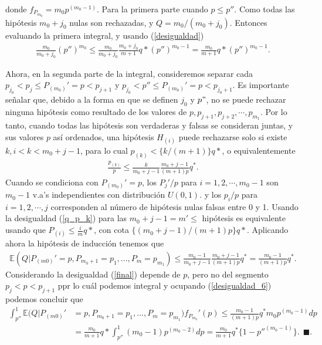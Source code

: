 \documentclass[11pt,letterpaper]{article}
\newcommand{\mE}{\mathbb{E}}
\newcommand{\finf}{\blacksquare.}
\begin{document}
donde $f_{P_{m_0}}=m_0p^{(m_0-1)}.$
Para la primera parte cuando $p\leq p''$. Como todas las hipótesis $m_0+j_0$ nulas son rechazadas, y $Q=m_0/(m_0+j_0)$. Entonces evaluando la primera integral, y usando (\ref{desigualdad})
\begin{align}\label{desigualdad_6}
\frac{m_0}{m_0+j_0}(p'')^{m_0} \leq \frac{m_0}{m_0+j_0} \frac{m_0+j_0}{m+1}q*(p'')^{m_0-1}=\frac{m_0}{m+1}q*(p'')^{m_0-1}.
\end{align}

Ahora, en la segunda parte de la integral, consideremos separar cada $p_{j_0}< p_j\leq P_{(m_0)}'=p<p_{j+1}$ y $p_{j_0}< p'' \leq P_{(m_0)}'=p<p_{j_0+1}$.  Es importante señalar que, debido a la forma en que se definen $j_0$ y $p"$, no se puede rechazar ninguna hipótesis como resultado de los valores de $p, p_{j + 1}, p_{j + 2},\cdots, p_{m_1}$. Por lo tanto, cuando todas las hipótesis son verdaderas y falsas se consideran juntas, y sus valores $p$ así ordenados, una hipótesis $H_{(i)}$ puede rechazarse solo si existe $k, i <k<m_0 + j-1$, para lo cual $p_{(k)} <\{k / ( m + 1)\} q *$, o equivalentemente 
\begin{align}\label{q_p_k}
\frac{p_{(k)}}{p}\leq \frac{k}{m_0+j-1} \frac{m_0+j-1}{(m+1)p}q^*.
\end{align}
Cuando se condiciona con $P_{(m_0)}'=p$, los $P_j'/p$ para $i=1,2, \cdots, m_0-1$ son $m_0-1$ v.a's independientes con distribución $U(0,1)$. y los $p_i/p$ para $i=1,2, \cdots,j$ corresponden al número de hipótesis nulas falsas entre 0 y 1. 
Usando la desigualdad (\ref{q_p_k}) para las $m_0+j-1=m'\leq $ hipótesis es equivalente usando que $P_{(i)}\leq \frac{i}{m}q*$, con cota $\{(m_0+j-1)/(m+1)p \}q*$. Aplicando ahora la hipótesis de inducción tenemos que 
\begin{align}\label{final}
\mE (Q | P_{(m0)}'=p, P_{m_0+1}=p_1, ..., P_m = p_{m_1}) \leq \frac{m_0-1}{m_0+j-1} \frac{m_0+j-1}{(m+1)p}q^* = \frac{m_0-1}{(m+1)p}q^*.
\end{align}
Considerando la desigualdad (\ref{final}) depende de $p$, pero no del segmento $p_j<p<p_{j+1}$ ppr lo cuál podemos integral y ocupando (\ref{desigualdad_6}) podemos concluir que 
\begin{align*}
\int_{p''}^1\mE (Q | P_{(m0)}'&=p, P_{m_0+1}=p_1, ..., P_m = p_{m_1})f_{P_{m_0}}'(p) \leq  \frac{m_0-1}{(m+1)p}q^*m_0p^{(m_0-1)}dp\\
&=\frac{m_0}{m+1}q*\int_{p''}^1(m_0-1)p^{(m_0-2)}dp=\frac{m_0}{m+1}q^*\{1-p''^{(m_0-1)} \}. \ \ \finf
\end{align*}
\end{document}

